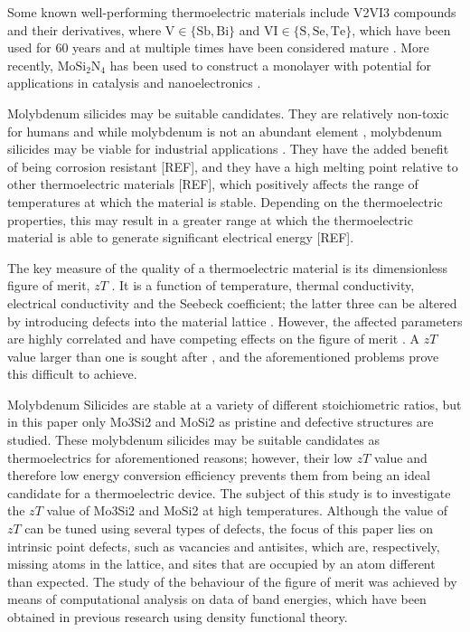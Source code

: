 \documentclass[12pt]{article}
\theoremstyle{plain}
\theoremstyle{definition}
\newcommand{\<}{\langle}
\renewcommand{\>}{\rangle}
\begin{document}
Some known well-performing thermoelectric materials include V2VI3 compounds and their derivatives, where $\text{V} \in \{\text{Sb}, \text{Bi}\}$ and $\text{VI} \in \{\text{S}, \text{Se}, \text{Te}\}$, which have been used for 60 years and at multiple times have been considered mature \cite{https://doi.org/10.1002/advs.201600004}. More recently, $\text{MoSi}_{2}\text{N}_{4}$ has been used to construct a monolayer with potential for applications in catalysis and nanoelectronics \cite{MA2022153214}.

Molybdenum silicides may be suitable candidates. They are relatively non-toxic for humans \cite{NOVOTNY2018272} and while molybdenum is not an abundant element \cite{HENCKENS201861}, molybdenum silicides may be viable for industrial applications \cite{STOLOFF20001313}.
They have the added benefit of being corrosion resistant [REF], and they have a high melting point relative to other thermoelectric materials [REF], which positively affects the range of temperatures at which the material is stable.
Depending on the thermoelectric properties, this may result in a greater range at which the thermoelectric material is able to generate significant electrical energy [REF].

The key measure of the quality of a thermoelectric material is its dimensionless figure of merit, $zT$ \cite{TakabatakeToshiro2014Petc}.
It is a function of temperature, thermal conductivity, electrical conductivity and the Seebeck coefficient; the latter three can be altered by introducing defects into the material lattice \cite{TakabatakeToshiro2014Petc}.
However, the affected parameters are highly correlated and have competing effects on the figure of merit \cite{TakabatakeToshiro2014Petc}.
A $zT$ value larger than one is sought after \cite{TakabatakeToshiro2014Petc}, and the aforementioned problems prove this difficult to achieve.

Molybdenum Silicides are stable at a variety of different stoichiometric ratios, but in this paper only Mo3Si2 and MoSi2 as pristine and defective structures are studied. These molybdenum silicides may be suitable candidates as thermoelectrics for aforementioned reasons; however, their low $zT$ value and therefore low energy conversion efficiency prevents them from being an ideal candidate for a thermoelectric device. The subject of this study is to investigate the $zT$ value of Mo3Si2 and MoSi2 at high temperatures. Although the value of $zT$ can be tuned using several types of defects, the focus of this paper lies on intrinsic point defects, such as vacancies and antisites, which are, respectively, missing atoms in the lattice, and sites that are occupied by an atom different than expected. The study of the behaviour of the figure of merit was achieved by means of computational analysis on data of band energies, which have been obtained in previous research using density functional theory.
\end{document}

